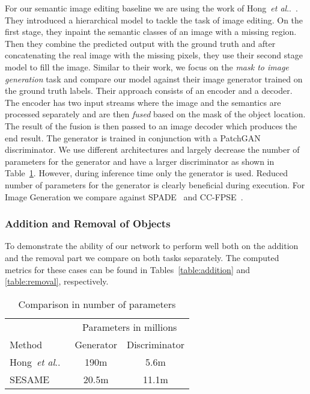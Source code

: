 \documentclass[runningheads]{llncs}
\makeatletter
\DeclareRobustCommand\onedot{\futurelet\@let@token\@onedot}
\def\@onedot{\ifx\@let@token.\else.\null\fi\xspace}
\def\etal{\emph{et al}\onedot}
\def\hong{Hong~\etal~\cite{hong2018learning}}
\makeatother
\begin{document}
For our semantic image editing baseline we are using the work of Hong~\etal~\cite{hong2018learning}. They introduced a hierarchical model to tackle the task of image editing. On the first stage, they inpaint the semantic classes of an image with a missing region. Then they combine the predicted output with the ground truth and after concatenating the real image with the missing pixels, they use their second stage model to fill the image.
Similar to their work, we focus on the \textit{mask to image generation} task and compare our model against their image generator trained on the ground truth labels.
Their approach consists of an encoder and a decoder.
The encoder has two input streams where the image and the semantics are processed separately and are then \textit{fused} based on the mask of the object location.
The result of the fusion is then passed to an image decoder which produces the end result. The generator is trained in conjunction with a PatchGAN discriminator.
We use different architectures and largely decrease the number of parameters for the generator and have a larger discriminator as shown in Table~\ref{table:parameters}. However, during inference time only the generator is used. Reduced number of parameters for the generator is clearly beneficial during execution. 
For Image Generation we compare against SPADE~\cite{park2019SPADE} and CC-FPSE~\cite{liu2019learning}.

\subsubsection{Addition and Removal of Objects} To demonstrate the ability of our network to perform well both on the addition and the removal part we compare on both tasks separately. The computed metrics for these cases can be found in Tables~\ref{table:addition} and \ref{table:removal}, respectively. 


\begin{table}[t]
\begin{center}
\caption{Comparison in number of parameters}
\begin{tabular}{l|c|c}
\multicolumn{1}{l}{} & \multicolumn{2}{c}{Parameters in millions} \\
\cline{2-3}
Method & Generator & Discriminator \\
\hline
\hong & 190m & 5.6m \\
SESAME & 20.5m & 11.1m \\
\end{tabular}
\end{center}
\label{table:parameters}
\end{table}
\end{document}
